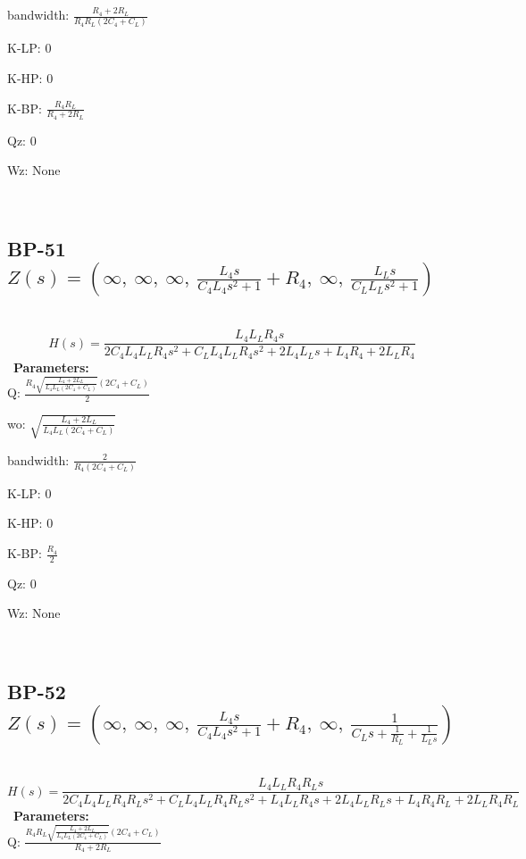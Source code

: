 \documentclass{article}
\begin{document}
bandwidth: $\frac{R_{4} + 2 R_{L}}{R_{4} R_{L} \left(2 C_{4} + C_{L}\right)}$\ 

K-LP: $0$\ 

K-HP: $0$\ 

K-BP: $\frac{R_{4} R_{L}}{R_{4} + 2 R_{L}}$\ 

Qz: $0$\ 

Wz: $\text{None}$\ 

\ 

\subsection{BP-51 $Z(s) = \left( \infty, \  \infty, \  \infty, \  \frac{L_{4} s}{C_{4} L_{4} s^{2} + 1} + R_{4}, \  \infty, \  \frac{L_{L} s}{C_{L} L_{L} s^{2} + 1}\right)$ } \ 
\textbf{\[H(s) = \frac{L_{4} L_{L} R_{4} s}{2 C_{4} L_{4} L_{L} R_{4} s^{2} + C_{L} L_{4} L_{L} R_{4} s^{2} + 2 L_{4} L_{L} s + L_{4} R_{4} + 2 L_{L} R_{4}}\] } \ 
\textbf{Parameters:}\\ 

Q: $\frac{R_{4} \sqrt{\frac{L_{4} + 2 L_{L}}{L_{4} L_{L} \left(2 C_{4} + C_{L}\right)}} \left(2 C_{4} + C_{L}\right)}{2}$\ 

wo: $\sqrt{\frac{L_{4} + 2 L_{L}}{L_{4} L_{L} \left(2 C_{4} + C_{L}\right)}}$\ 

bandwidth: $\frac{2}{R_{4} \left(2 C_{4} + C_{L}\right)}$\ 

K-LP: $0$\ 

K-HP: $0$\ 

K-BP: $\frac{R_{4}}{2}$\ 

Qz: $0$\ 

Wz: $\text{None}$\ 

\ 

\subsection{BP-52 $Z(s) = \left( \infty, \  \infty, \  \infty, \  \frac{L_{4} s}{C_{4} L_{4} s^{2} + 1} + R_{4}, \  \infty, \  \frac{1}{C_{L} s + \frac{1}{R_{L}} + \frac{1}{L_{L} s}}\right)$ } \ 
\textbf{\[H(s) = \frac{L_{4} L_{L} R_{4} R_{L} s}{2 C_{4} L_{4} L_{L} R_{4} R_{L} s^{2} + C_{L} L_{4} L_{L} R_{4} R_{L} s^{2} + L_{4} L_{L} R_{4} s + 2 L_{4} L_{L} R_{L} s + L_{4} R_{4} R_{L} + 2 L_{L} R_{4} R_{L}}\] } \ 
\textbf{Parameters:}\\ 

Q: $\frac{R_{4} R_{L} \sqrt{\frac{L_{4} + 2 L_{L}}{L_{4} L_{L} \left(2 C_{4} + C_{L}\right)}} \left(2 C_{4} + C_{L}\right)}{R_{4} + 2 R_{L}}$\ 
\end{document}
